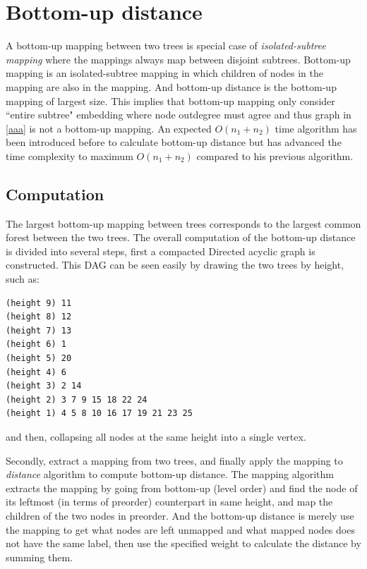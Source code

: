 \documentclass[a4paper]{article}
\begin{document}
\section{Bottom-up distance}
A bottom-up mapping between two trees is special case of \textit{isolated-subtree mapping}\cite{TANAKA} where the mappings always map between disjoint subtrees.
Bottom-up mapping is an isolated-subtree mapping in which children of nodes in the mapping are also in the mapping. And bottom-up distance is the bottom-up mapping of largest size.
This implies that bottom-up mapping only consider ``entire subtree" embedding where node outdegree must agree and thus graph in \ref{aaa} is not a bottom-up mapping.
An expected $O(n_1 + n_2)$ time algorithm has been introduced before to calculate bottom-up distance but \cite{Valiente01anefficient} has advanced the time complexity to maximum $O(n_1 + n_2)$ compared to his previous algorithm.

\subsection{Computation}
The largest bottom-up mapping between trees corresponds to the largest common forest between the two trees. The overall computation of the bottom-up distance is divided into several steps, first a compacted Directed acyclic graph is constructed. This DAG can be seen easily by drawing the two trees by height, such as:
\begin{verbatim}
(height 9) 11
(height 8) 12
(height 7) 13
(height 6) 1
(height 5) 20
(height 4) 6
(height 3) 2 14
(height 2) 3 7 9 15 18 22 24
(height 1) 4 5 8 10 16 17 19 21 23 25
\end{verbatim}
and then, collapsing all nodes at the same height into a single vertex.

Secondly, extract a mapping from two trees, and finally apply the mapping to \textit{distance} algorithm to compute bottom-up distance. The mapping algorithm extracts the mapping by going from bottom-up (level order) and find the node of its leftmost (in terms of preorder) counterpart in same height, and map the children of the two nodes in preorder. And the bottom-up distance is merely use the mapping to get what nodes are left unmapped and what mapped nodes does not have the same label, then use the specified weight to calculate the distance by summing them.



\end{document}
